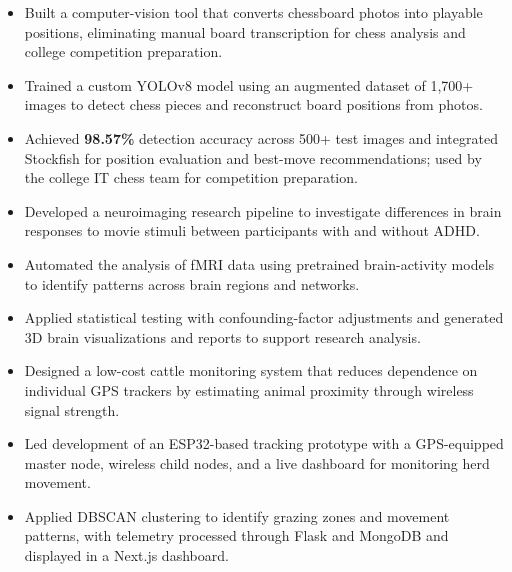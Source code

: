 
\begin{itemize}
  \item Built a computer-vision tool that converts chessboard photos into playable positions, eliminating manual board transcription for chess analysis and college competition preparation.
  \item Trained a custom YOLOv8 model using an augmented dataset of 1,700+ images to detect chess pieces and reconstruct board positions from photos.
  \item Achieved \textbf{98.57\%} detection accuracy across 500+ test images and integrated Stockfish for position evaluation and best-move recommendations; used by the college IT chess team for competition preparation.
\end{itemize}

\entryspace
{}
\begin{itemize}
  \item Developed a neuroimaging research pipeline to investigate differences in brain responses to movie stimuli between participants with and without ADHD.
  \item Automated the analysis of fMRI data using pretrained brain-activity models to identify patterns across brain regions and networks.
  \item Applied statistical testing with confounding-factor adjustments and generated 3D brain visualizations and reports to support research analysis.
\end{itemize}

\entryspace
{}
\begin{itemize}
  \item Designed a low-cost cattle monitoring system that reduces dependence on individual GPS trackers by estimating animal proximity through wireless signal strength.
  \item Led development of an ESP32-based tracking prototype with a GPS-equipped master node, wireless child nodes, and a live dashboard for monitoring herd movement.
  \item Applied DBSCAN clustering to identify grazing zones and movement patterns, with telemetry processed through Flask and MongoDB and displayed in a Next.js dashboard.
\end{itemize}


